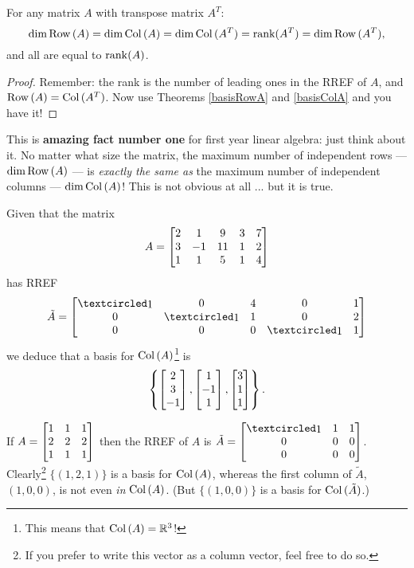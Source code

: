 \begin{corollary}
For any matrix $A$ with transpose matrix $A^T$:
$$
\dim \operatorname{Row\,}(A)  = \dim \operatorname{Col\,}(A)  = \dim \operatorname{Col\,}(A^T)  = \textrm{rank}(A^T) = \dim \operatorname{Row\,}(A^T), 
$$ and all are equal to $ \operatorname{rank}(A)$.
\end{corollary}

\begin{proof}
Remember: the rank is the number of leading ones in the RREF of $A$,
and $\operatorname{Row\,}(A) = \operatorname{Col\,}(A^T)$.  Now use Theorems \ref{basisRowA}  and \ref{basisColA} and
you have it!
\end{proof}

This is {\bf amazing fact number one} for first year linear algebra: just think about it. No matter  what size the matrix, the maximum number of independent rows --- $\dim \operatorname{Row\,}(A)$ --- is {\it exactly the same as} the maximum number of independent columns --- $\dim \operatorname{Col\,}(A)$! This is not obvious at all ... but it is true.

\begin{myexample} Given that the matrix 
$$
A = \left[ \begin{matrix} 2&1&9&3&7\\3&-1&11&1&2\\1&1&5&1&4 \end{matrix} \right]
$$
has RREF
$$
\tilde A = \mat{\pivot&0&4&0&1\\0&\pivot&1&0&2\\0&0&0&\pivot&1}
$$
we deduce that a basis for $\operatorname{Col\,}(A)$\footnote{This means that $\operatorname{Col\,}(A)=\mathbb{R}^3$! } is
$$
\left\{ \left[ \begin{matrix} 2\\3\\-1 \end{matrix} \right], \left[ \begin{matrix} 1\\-1\\1 \end{matrix} \right], \left[ \begin{matrix} 3\\1\\1 \end{matrix} \right] \right\}.
$$


\end{myexample}



\begin{myexample}
If $A = \left[ \begin{matrix} 1&1&1\\2&2&2\\1&1&1 \end{matrix} \right]$ then the RREF of $A$ is $\tilde A = \mat{\pivot&1&1\\0&0&0\\0&0&0}$.  Clearly\footnote{If you prefer to write this vector as a column vector, feel free to do so.} $\{ (1,2,1)\}$ is a basis for $\operatorname{Col\,}(A)$, whereas the first column of $\tilde A$, 
$(1,0,0)$, is not even {\it in} $\operatorname{Col\,}(A)$.  (But $\{ (1,0,0)\}$ is a basis
for $\operatorname{Col\,}(\tilde A)$.)
\end{myexample}

